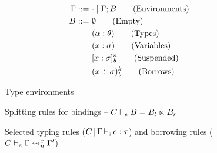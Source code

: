 \begin{figure}[tp]
  \begin{minipage}{0.36\linewidth}
  \begin{align*}
    \Gamma ::=&\ \cdot \mid \Gamma;B\tag{Environments}\\
    B ::=&\ \emptyset \tag{Empty} \\
    |&\ (\alpha : \theta) \tag{Types}\\
    |&\ (x : \sigma) \tag{Variables} \\
    |&\ [x : \sigma]_{\textit{b}}^n \tag{Suspended} \\
    |&\ ( x \div \sigma)_{\textit{b}}^{k} \tag{Borrows}
  \end{align*}
  \vspace{-15pt}
  \caption{Type environments}
  \label{grammar:env}
  \end{minipage}\hfill
  \begin{minipage}{0.6\linewidth}
    
    \vspace{-5pt}
    \caption{Splitting rules for bindings -- $C \vdash_e B = B_l \ltimes B_r$}
    \label{sdtyp:split}
  \end{minipage}
\end{figure}


\begin{figure*}[tp]
    \vspace{-10pt}
    \caption{Selected typing rules ($C \operatorname{|} \Gamma \operatorname{\vdash_s} e : \tau$)
      and borrowing rules ($C \vdash_e \Gamma \rightsquigarrow_{n}^{x} \Gamma'$)}
    \label{selectrules:borrow}
    \label{selectrules:binders}
    \label{sdtyp:app}
    \label{selectrules:region}
    \label{env:rule:borrow}
    \vspace{-5pt}
\end{figure*}

